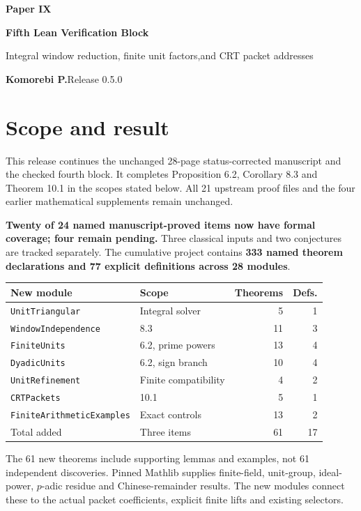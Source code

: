 \documentclass[11pt]{article}
\begin{document}
{\LARGE\bfseries\color{ink}Paper IX}\par
{\Large\bfseries Fifth Lean Verification Block}\par
{\large Integral window reduction, finite unit factors,\newline and CRT packet addresses}\par
\textbf{Komorebi P.}\hfill Release 0.5.0
\bigskip
\section*{Scope and result}
This release continues the unchanged 28-page status-corrected manuscript and the checked fourth block. It completes Proposition 6.2, Corollary 8.3 and Theorem 10.1 in the scopes stated below. All 21 upstream proof files and the four earlier mathematical supplements remain unchanged.

\textbf{Twenty of 24 named manuscript-proved items now have formal coverage; four remain pending.} Three classical inputs and two conjectures are tracked separately. The cumulative project contains \textbf{333 named theorem declarations and 77 explicit definitions across 28 modules}.

\begin{center}
\begin{tabular}{@{}p{}p{}rr@{}}
\toprule
New module & Scope & Theorems & Defs.\\\midrule
\texttt{UnitTriangular} & Integral solver & 5 & 1\\
\texttt{WindowIndependence} & 8.3 & 11 & 3\\
\texttt{FiniteUnits} & 6.2, prime powers & 13 & 4\\
\texttt{DyadicUnits} & 6.2, sign branch & 10 & 4\\
\texttt{UnitRefinement} & Finite compatibility & 4 & 2\\
\texttt{CRTPackets} & 10.1 & 5 & 1\\
\texttt{FiniteArithmeticExamples} & Exact controls & 13 & 2\\\midrule
Total added & Three items & 61 & 17\\\bottomrule
\end{tabular}
\end{center}
The 61 new theorems include supporting lemmas and examples, not 61 independent discoveries. Pinned Mathlib supplies finite-field, unit-group, ideal-power, $p$-adic residue and Chinese-remainder results. The new modules connect these to the actual packet coefficients, explicit finite lifts and existing selectors.
\end{document}
